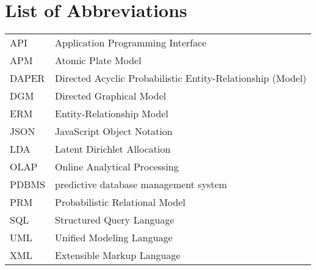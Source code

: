 \section*{List of Abbreviations}

\begin{tabular}{ll}
API & Application Programming Interface\\
APM & Atomic Plate Model\\
DAPER & Directed Acyclic Probabilistic Entity-Relationship (Model)\\
DGM & Directed Graphical Model\\
ERM & Entity-Relationship Model\\
JSON & JavaScript Object Notation\\
LDA & Latent Dirichlet Allocation\\
OLAP & Online Analytical Processing\\
PDBMS & predictive database management system\\
PRM & Probabilistic Relational Model\\
SQL & Structured Query Language\\
UML & Unified Modeling Language\\
XML & Extensible Markup Language

\end{tabular}